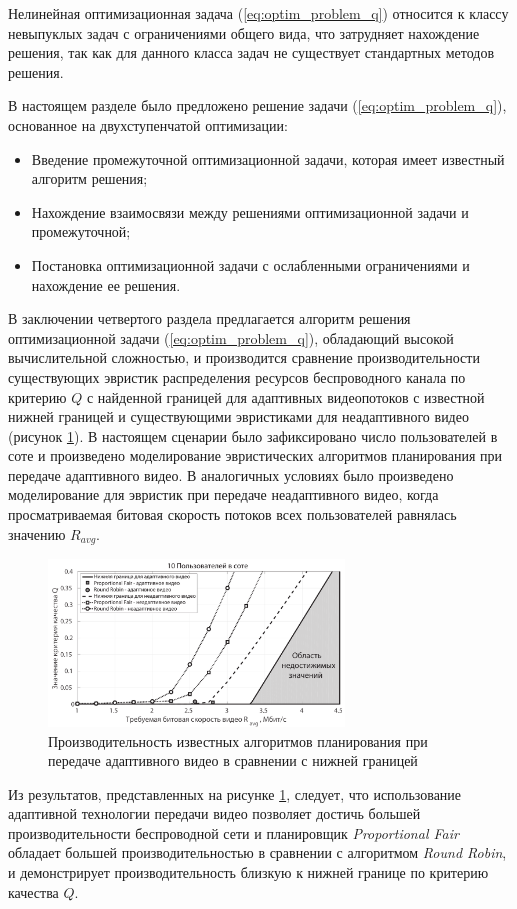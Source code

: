 Нелинейная оптимизационная задача (\ref{eq:optim_problem_q}) относится к классу невыпуклых задач с ограничениями общего вида, что затрудняет нахождение решения, так как для данного класса задач не существует стандартных методов решения.

В настоящем разделе было предложено решение задачи (\ref{eq:optim_problem_q}), основанное на двухступенчатой оптимизации:
\begin{itemize}
	\item Введение промежуточной оптимизационной задачи, которая имеет известный алгоритм решения;
	\item Нахождение взаимосвязи между решениями оптимизационной задачи и промежуточной;
	\item Постановка оптимизационной задачи с ослабленными ограничениями и нахождение ее решения.
\end{itemize}
В заключении четвертого раздела предлагается алгоритм решения оптимизационной задачи (\ref{eq:optim_problem_q}), обладающий высокой вычислительной сложностью, и производится сравнение производительности существующих эвристик распределения ресурсов беспроводного канала по критерию $Q$ с найденной границей для адаптивных видеопотоков с известной нижней границей и существующими эвристиками для неадаптивного видео (рисунок \ref{fig:Q_PLOT}). В настоящем сценарии было зафиксировано число пользователей в соте и произведено моделирование эвристических алгоритмов планирования при передаче адаптивного видео. В аналогичных условиях было произведено моделирование для эвристик при передаче неадаптивного видео, когда просматриваемая битовая скорость потоков всех пользователей равнялась значению $R_{avg}$.
\begin{figure}[htbp]
\begin{center}
\includegraphics[width=0.7\textwidth]{../Dissertation/images/Chapter4/10_Users_v2.pdf}
\caption{Производительность известных алгоритмов планирования при передаче адаптивного видео в сравнении с нижней границей}
\label{fig:Q_PLOT}
\end{center}
\end{figure}
Из результатов, представленных на рисунке \ref{fig:Q_PLOT}, следует, что использование адаптивной технологии передачи видео позволяет достичь большей производительности беспроводной сети и планировщик \textit{Proportional Fair} обладает большей производительностью в сравнении с алгоритмом \textit{Round Robin}, и демонстрирует производительность близкую к нижней границе по критерию качества $Q$.

